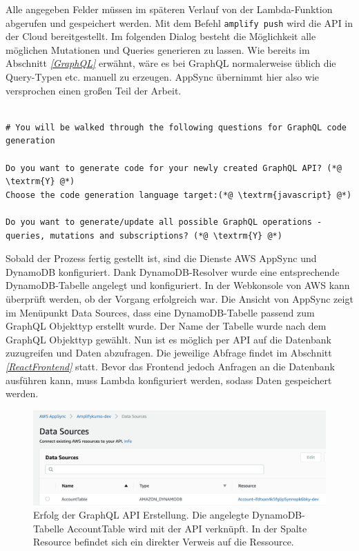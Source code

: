 Alle angegeben Felder müssen im späteren Verlauf von der Lambda-Funktion abgerufen und gespeichert werden.
Mit dem Befehl \verb+amplify push+ wird die API in der Cloud bereitgestellt.
Im folgenden Dialog besteht die Möglichkeit alle möglichen Mutationen und Queries generieren zu lassen.
Wie bereits im Abschnitt \textit{\ref{GraphQL} } erwähnt, wäre es bei GraphQL normalerweise üblich die Query-Typen etc. manuell zu erzeugen.
AppSync übernimmt hier also wie versprochen einen großen Teil der Arbeit.
\clearpage
\begin{lstlisting}[basicstyle=\ttfamily\small, breaklines=true , frame = single, backgroundcolor=\color{flashwhite} ]

# You will be walked through the following questions for GraphQL code generation

Do you want to generate code for your newly created GraphQL API? (*@ \textrm{Y} @*)
Choose the code generation language target:(*@ \textrm{javascript} @*)

Do you want to generate/update all possible GraphQL operations -
queries, mutations and subscriptions? (*@ \textrm{Y} @*)

\end{lstlisting}


Sobald der Prozess fertig gestellt ist, sind die Dienste AWS AppSync und DynamoDB konfiguriert.
Dank DynamoDB-Resolver wurde eine entsprechende DynamoDB-Tabelle angelegt und konfiguriert.
In der Webkonsole von AWS kann überprüft werden, ob der Vorgang erfolgreich war.
Die Ansicht von AppSync zeigt im Menüpunkt \glqq Data Sources\grqq{}, dass eine DynamoDB-Tabelle passend zum GraphQL Objekttyp erstellt wurde.
Der Name der Tabelle wurde nach dem GraphQL Objekttyp gewählt.
Nun ist es möglich per API auf die Datenbank zuzugreifen und Daten abzufragen.
Die jeweilige Abfrage findet im Abschnitt \textit{\ref{ReactFrontend} } statt.
Bevor das Frontend jedoch Anfragen an die Datenbank ausführen kann, muss Lambda konfiguriert werden, sodass Daten gespeichert werden.
\\
\begin{figure}[htbp]
    \centering
    \includegraphics[width=1.0\textwidth]{50-Implementierung/AppSync-DynamoDB.png}
    \caption{Erfolg der GraphQL API Erstellung. Die angelegte DynamoDB-Tabelle \glqq AccountTable\grqq{} wird mit der API verknüpft. In der Spalte \grqq Resource\grqq{} befindet sich ein direkter Verweis auf die Ressource. }
    \label{fig:meine-grafik}
\end{figure}




